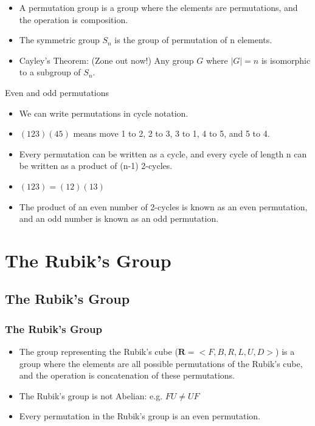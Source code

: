 \documentclass[xcolor=pdftex,dvipsnames,table]{beamer}
\begin{document}
\begin{frame}
  \begin{itemize}
    \item A permutation group is a group where the elements are permutations, and the operation is composition.
    \item The symmetric group $S_n$ is the group of permutation of n elements.
    \item Cayley's Theorem: (Zone out now!) Any group $G$ where $|G|=n$ is isomorphic to a subgroup of $S_n$.
  \end{itemize}
\end{frame}

\begin{frame}
  Even and odd permutations
  \begin{itemize}
    \item We can write permutations in cycle notation. 
    \item $(123)(45)$ means move 1 to 2, 2 to 3, 3 to 1, 4 to 5, and 5 to 4.
    \item Every permutation can be written as a cycle, and every cycle of length n can be written as a product of (n-1) 2-cycles.
    \item $(123) = (12)(13)$
    \item The product of an even number of 2-cycles is known as an even permutation, and an odd number is known as an odd permutation.
  \end{itemize}
\end{frame}

\section{The Rubik's Group}
\subsection{The Rubik's Group}
\begin{frame}
  \frametitle{The Rubik's Group}
  \begin{itemize}
    \item The group representing the Rubik's cube ($ \mathbf{R} = <F, B, R, L, U, D>$) is a group where the elements are all possible permutations of the Rubik's cube, and the operation is concatenation of these permutations.
    \item The Rubik's group is not Abelian: e.g. $FU \neq UF$
    \item Every permutation in the Rubik's group is an even permutation.
  \end{itemize}
\end{frame}
\end{document}
